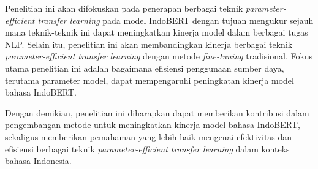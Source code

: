 Penelitian ini akan difokuskan pada penerapan berbagai teknik \textit{parameter-efficient transfer learning} pada model IndoBERT dengan tujuan mengukur sejauh mana teknik-teknik ini dapat meningkatkan kinerja model dalam berbagai tugas NLP. Selain itu, penelitian ini akan membandingkan kinerja berbagai teknik \textit{parameter-efficient transfer learning} dengan metode \textit{fine-tuning} tradisional. Fokus utama penelitian ini adalah bagaimana efisiensi penggunaan sumber daya, terutama parameter model, dapat mempengaruhi peningkatan kinerja model bahasa IndoBERT.

Dengan demikian, penelitian ini diharapkan dapat memberikan kontribusi dalam pengembangan metode untuk meningkatkan kinerja model bahasa IndoBERT, sekaligus memberikan pemahaman yang lebih baik mengenai efektivitas dan efisiensi berbagai teknik \textit{parameter-efficient transfer learning} dalam konteks bahasa Indonesia.